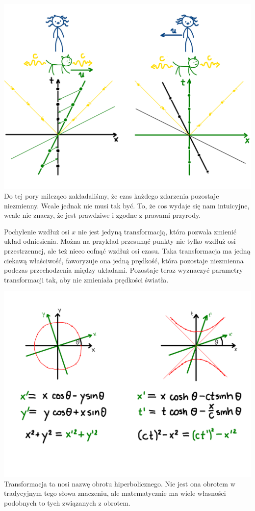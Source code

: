 \documentclass[10pt,twocolumn,fleqn,polish]{article}
\begin{document}
\noindent\includegraphics[width=1\linewidth]{pages/STA-page20}
Do tej pory milcząco zakładaliśmy, że czas każdego zdarzenia pozostaje niezmienny.
Wcale jednak nie musi tak być. To, że cos wydaje się nam intuicyjne, wcale nie znaczy,
że jest prawdziwe i zgodne z prawami przyrody.

Pochylenie wzdłuż osi $x$ nie jest jedyną transformacją, która pozwala zmienić układ odniesienia.
Można na przykład przesunąć punkty nie tylko wzdłuż osi przestrzennej, ale też
nieco cofnąć wzdłuż osi czasu. Taka transformacja ma jedną ciekawą właściwość, faworyzuje ona
jedną prędkość, która pozostaje niezmienna podczas przechodzenia między układami.
Pozostaje teraz wyznaczyć parametry transformacji tak, aby nie zmieniała prędkości światła.
\newpage

\noindent\includegraphics[width=1\linewidth]{pages/STA-page21}
Transformacja ta nosi nazwę obrotu hiperbolicznego. Nie jest ona obrotem w
tradycyjnym tego słowa znaczeniu, ale matematycznie ma wiele własności podobnych
to tych związanych z obrotem.
\end{document}
